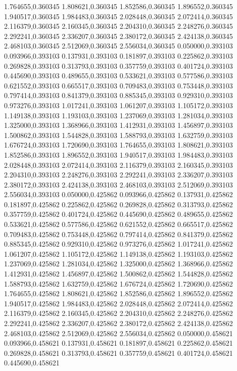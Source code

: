 1.764655,0.360345
1.808621,0.360345
1.852586,0.360345
1.896552,0.360345
1.940517,0.360345
1.984483,0.360345
2.028448,0.360345
2.072414,0.360345
2.116379,0.360345
2.160345,0.360345
2.204310,0.360345
2.248276,0.360345
2.292241,0.360345
2.336207,0.360345
2.380172,0.360345
2.424138,0.360345
2.468103,0.360345
2.512069,0.360345
2.556034,0.360345
0.050000,0.393103
0.093966,0.393103
0.137931,0.393103
0.181897,0.393103
0.225862,0.393103
0.269828,0.393103
0.313793,0.393103
0.357759,0.393103
0.401724,0.393103
0.445690,0.393103
0.489655,0.393103
0.533621,0.393103
0.577586,0.393103
0.621552,0.393103
0.665517,0.393103
0.709483,0.393103
0.753448,0.393103
0.797414,0.393103
0.841379,0.393103
0.885345,0.393103
0.929310,0.393103
0.973276,0.393103
1.017241,0.393103
1.061207,0.393103
1.105172,0.393103
1.149138,0.393103
1.193103,0.393103
1.237069,0.393103
1.281034,0.393103
1.325000,0.393103
1.368966,0.393103
1.412931,0.393103
1.456897,0.393103
1.500862,0.393103
1.544828,0.393103
1.588793,0.393103
1.632759,0.393103
1.676724,0.393103
1.720690,0.393103
1.764655,0.393103
1.808621,0.393103
1.852586,0.393103
1.896552,0.393103
1.940517,0.393103
1.984483,0.393103
2.028448,0.393103
2.072414,0.393103
2.116379,0.393103
2.160345,0.393103
2.204310,0.393103
2.248276,0.393103
2.292241,0.393103
2.336207,0.393103
2.380172,0.393103
2.424138,0.393103
2.468103,0.393103
2.512069,0.393103
2.556034,0.393103
0.050000,0.425862
0.093966,0.425862
0.137931,0.425862
0.181897,0.425862
0.225862,0.425862
0.269828,0.425862
0.313793,0.425862
0.357759,0.425862
0.401724,0.425862
0.445690,0.425862
0.489655,0.425862
0.533621,0.425862
0.577586,0.425862
0.621552,0.425862
0.665517,0.425862
0.709483,0.425862
0.753448,0.425862
0.797414,0.425862
0.841379,0.425862
0.885345,0.425862
0.929310,0.425862
0.973276,0.425862
1.017241,0.425862
1.061207,0.425862
1.105172,0.425862
1.149138,0.425862
1.193103,0.425862
1.237069,0.425862
1.281034,0.425862
1.325000,0.425862
1.368966,0.425862
1.412931,0.425862
1.456897,0.425862
1.500862,0.425862
1.544828,0.425862
1.588793,0.425862
1.632759,0.425862
1.676724,0.425862
1.720690,0.425862
1.764655,0.425862
1.808621,0.425862
1.852586,0.425862
1.896552,0.425862
1.940517,0.425862
1.984483,0.425862
2.028448,0.425862
2.072414,0.425862
2.116379,0.425862
2.160345,0.425862
2.204310,0.425862
2.248276,0.425862
2.292241,0.425862
2.336207,0.425862
2.380172,0.425862
2.424138,0.425862
2.468103,0.425862
2.512069,0.425862
2.556034,0.425862
0.050000,0.458621
0.093966,0.458621
0.137931,0.458621
0.181897,0.458621
0.225862,0.458621
0.269828,0.458621
0.313793,0.458621
0.357759,0.458621
0.401724,0.458621
0.445690,0.458621
